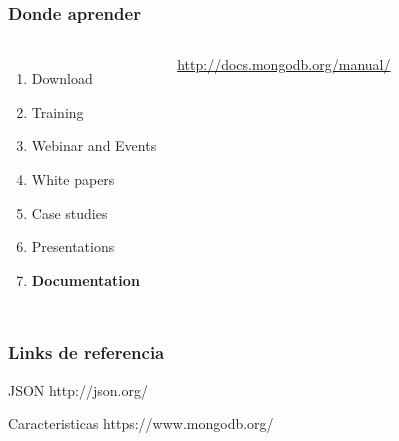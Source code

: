 \documentclass{beamer}
\begin{document}
\begin{frame}
\frametitle{Donde aprender}
\begin{columns}[c] %
\begin{enumerate}
\item Download
\item Training
\item Webinar and Events
\item White papers
\item Case studies
\item Presentations
\item \textbf{Documentation}
\end{enumerate}

{\color{blue}\url{http://docs.mongodb.org/manual/}}
\end{columns}
\end{frame}
\begin{frame}
\frametitle{Links de referencia}
\footnotesize{
\begin{thebibliography}{99} %
 JSON
\newblock http://json.org/
\end{thebibliography}
}
\footnotesize{
\begin{thebibliography}{99} %
 Caracteristicas
\newblock https://www.mongodb.org/
\end{thebibliography}
}
\end{frame}
\end{document}
